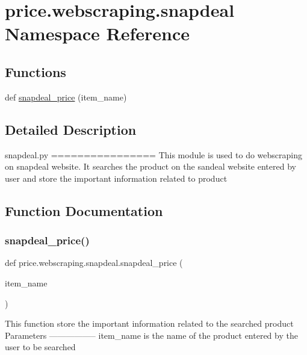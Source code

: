 \hypertarget{namespaceprice_1_1webscraping_1_1snapdeal}{}\section{price.\+webscraping.\+snapdeal Namespace Reference}
\label{namespaceprice_1_1webscraping_1_1snapdeal}
\subsection*{Functions}
\begin{DoxyCompactItemize}
\item 
def \hyperlink{namespaceprice_1_1webscraping_1_1snapdeal_a046d35639637d82e799185985201879e}{snapdeal\+\_\+price} (item\+\_\+name)
\end{DoxyCompactItemize}


\subsection{Detailed Description}
\begin{DoxyVerb}snapdeal.py
================
This module is used to do webscraping on snapdeal website. It searches the product on the sandeal website entered by user and store the important information related to product
\end{DoxyVerb}
 

\subsection{Function Documentation}
\mbox{\label{namespaceprice_1_1webscraping_1_1snapdeal_a046d35639637d82e799185985201879e}} 
\subsubsection{\texorpdfstring{snapdeal\+\_\+price()}{snapdeal\_price()}}
{\footnotesize\ttfamily def price.\+webscraping.\+snapdeal.\+snapdeal\+\_\+price (\begin{DoxyParamCaption}\item[{}]{item\+\_\+name }\end{DoxyParamCaption})}

\begin{DoxyVerb}This function store the important information related to the searched product
Parameters
-----------------
item_name is the name of the product entered by the user to be searched
\end{DoxyVerb}
 